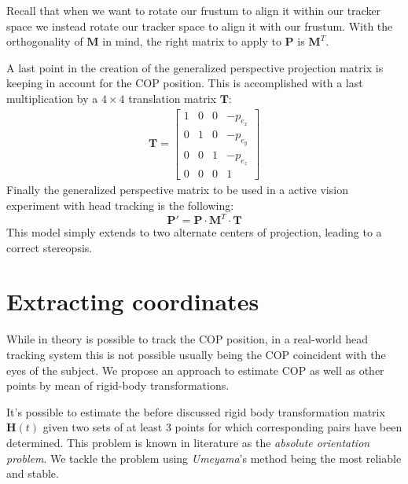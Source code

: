 \documentclass[acmtocl,acmnow]{acmtrans2m}
\begin{document}
Recall that when we want to rotate our frustum to align it within our
tracker space we instead rotate our tracker space to align it with our frustum.
With the orthogonality of $\mathbf{M}$ in mind, the right matrix to apply to $\mathbf{P}$ is $\mathbf{M}^T$.

A last point in the creation of the generalized perspective projection matrix is keeping in account for the COP position. This is accomplished with a last
multiplication by a $4 \times 4$ translation matrix $\mathbf{T}$:
\begin{align*}
\mathbf{T} =
\begin{bmatrix}
1 & 0 & 0 & -p_{e_x} \\
0 & 1 & 0 & -p_{e_y} \\
0 & 0 & 1 & -p_{e_z} \\
0 & 0 & 0 & 1 
\end{bmatrix}
\end{align*}
Finally the generalized perspective matrix to be used in a active vision
experiment with head tracking is the following:
\begin{equation}
\mathbf{P'} = \mathbf{P} \cdot \mathbf{M}^T \cdot \mathbf{T}
\end{equation}
This model simply extends to two alternate centers of projection, leading to a correct stereopsis.

\section{Extracting coordinates}
While in theory is possible to track the COP position, in a real-world head tracking system this is not possible usually being the COP coincident with the eyes of the subject. We propose an approach to estimate 
COP as well as other points by mean of rigid-body transformations.

It's possible to estimate the before discussed rigid body transformation matrix $\mathbf{H}(t)$ given two sets of at least $3$ points for which corresponding pairs have been determined. This problem is known 
in literature as the \emph{absolute orientation problem}. We tackle the problem using \emph{Umeyama}'s method \cite{umeyama} being the most reliable and stable.

\end{document}
